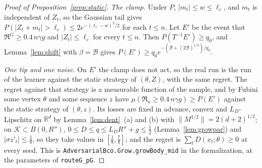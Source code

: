 \documentclass[11pt]{amsart}
\theoremstyle{definition}
\numberwithin{equation}{section}
\newcommand{\R}{\mathbb{R}}
\newcommand{\cK}{\mathcal{K}}
\newcommand{\Reg}{\mathfrak{R}}
\begin{document}
\begin{proof}[Proof of Proposition~\ref{prop:static}]
\emph{The clamp.} Under $P$, $|m_t|\le w\le\ell_c$, and $m_t$ is independent of $Z_t$, so the Gaussian tail gives $P(|Z_t+m_t|>\ell_c)\le2e^{-(\ell_c-w)^2/2}$ for each $t\le n$. Let $E'$ be the event that $\Reg^G\ge0.4\,n\gamma g$ and $|Z_t|\le\ell_c$ for every $t\le n$. Then $P(T^{-1}E')\ge q_0$, and Lemma~\ref{lem:shift} with $\beta=\mathcal B$ gives $P(E')\ge q_0e^{-(\mathcal B+(2\mathcal B)^{1/2})/q_0}$.

\emph{One tip and one noise.} On $E'$ the clamp does not act, so the real run is the run of the learner against the static strategy of $(\theta,Z)$, with the same regret. The regret against that strategy is a measurable function of the sample, and by Fubini some vertex $\theta$ and some sequence $z$ have $\mu(\Reg_n\ge0.4\,n\gamma g)\ge P(E')$ against the static strategy of $(\theta,z)$. Its losses are fixed in advance, convex and $L_D$-Lipschitz on $\R^d$ by Lemma~\ref{lem:dent}~(a) and (b) with $\|M^{1/2}\|=2(d+2)^{1/2}$; on $\cK\subset B(0,R'')$, $0\le D\le q\le L_DR''+g\le\frac12$ (Lemma~\ref{lem:growpar}) and $|\sigma z'_t|\le\frac18$, so they take values in $[\frac18,\frac78]$; and the regret is $\sum_tD(x_t;\theta)\ge0$ at every seed.
This is \texttt{AdversarialBco.Grow.growBody\_mid} in the formalization, at the parameters of \texttt{routeG\_pG}.
\end{proof}
\end{document}
